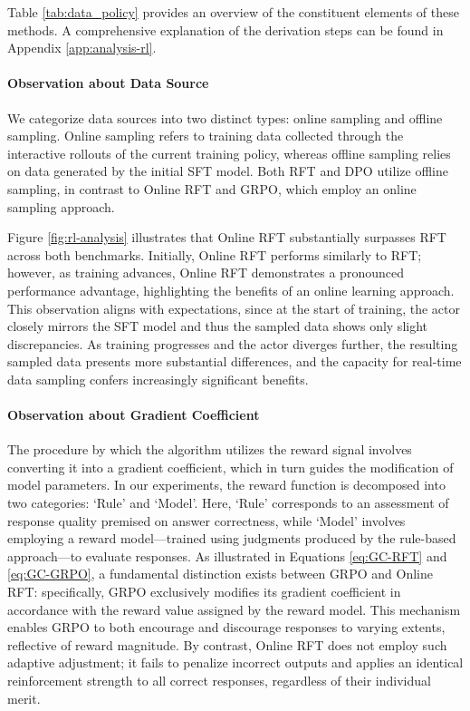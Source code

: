 \begin{itemize}[topsep=0pt]
Table \ref{tab:data_policy} provides an overview of the constituent elements of these methods. A comprehensive explanation of the derivation steps can be found in Appendix \ref{app:analysis-rl}.

\paragraph{Observation about Data Source} We categorize data sources into two distinct types: online sampling and offline sampling. Online sampling refers to training data collected through the interactive rollouts of the current training policy, whereas offline sampling relies on data generated by the initial SFT model. Both RFT and DPO utilize offline sampling, in contrast to Online RFT and GRPO, which employ an online sampling approach.

Figure \ref{fig:rl-analysis} illustrates that Online RFT substantially surpasses RFT across both benchmarks. Initially, Online RFT performs similarly to RFT; however, as training advances, Online RFT demonstrates a pronounced performance advantage, highlighting the benefits of an online learning approach. This observation aligns with expectations, since at the start of training, the actor closely mirrors the SFT model and thus the sampled data shows only slight discrepancies. As training progresses and the actor diverges further, the resulting sampled data presents more substantial differences, and the capacity for real-time data sampling confers increasingly significant benefits.

\paragraph{Observation about Gradient Coefficient} The procedure by which the algorithm utilizes the reward signal involves converting it into a gradient coefficient, which in turn guides the modification of model parameters. In our experiments, the reward function is decomposed into two categories: `Rule' and `Model'. Here, `Rule' corresponds to an assessment of response quality premised on answer correctness, while `Model' involves employing a reward model—trained using judgments produced by the rule-based approach—to evaluate responses. As illustrated in Equations \ref{eq:GC-RFT} and \ref{eq:GC-GRPO}, a fundamental distinction exists between GRPO and Online RFT: specifically, GRPO exclusively modifies its gradient coefficient in accordance with the reward value assigned by the reward model. This mechanism enables GRPO to both encourage and discourage responses to varying extents, reflective of reward magnitude. By contrast, Online RFT does not employ such adaptive adjustment; it fails to penalize incorrect outputs and applies an identical reinforcement strength to all correct responses, regardless of their individual merit.


\end{itemize}
